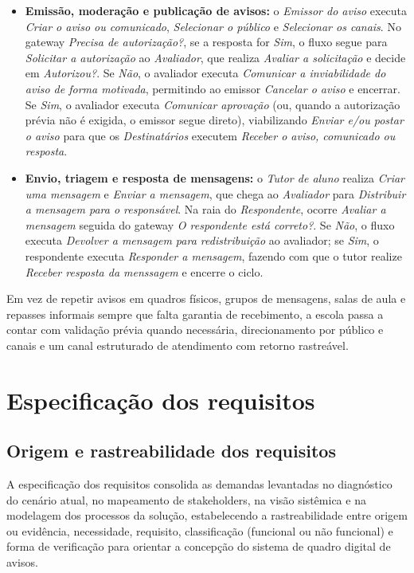 \documentclass[a4paper,12pt]{report}
\begin{document}
\begin{itemize}
    \item \textbf{Emissão, moderação e publicação de avisos:} o \textit{Emissor do aviso} executa \textit{Criar o aviso ou comunicado}, \textit{Selecionar o público} e \textit{Selecionar os canais}. No gateway \textit{Precisa de autorização?}, se a resposta for \textit{Sim}, o fluxo segue para \textit{Solicitar a autorização} ao \textit{Avaliador}, que realiza \textit{Avaliar a solicitação} e decide em \textit{Autorizou?}. Se \textit{Não}, o avaliador executa \textit{Comunicar a inviabilidade do aviso de forma motivada}, permitindo ao emissor \textit{Cancelar o aviso} e encerrar. Se \textit{Sim}, o avaliador executa \textit{Comunicar aprovação} (ou, quando a autorização prévia não é exigida, o emissor segue direto), viabilizando \textit{Enviar e/ou postar o aviso} para que os \textit{Destinatários} executem \textit{Receber o aviso, comunicado ou resposta}.
    \item \textbf{Envio, triagem e resposta de mensagens:} o \textit{Tutor de aluno} realiza \textit{Criar uma mensagem} e \textit{Enviar a mensagem}, que chega ao \textit{Avaliador} para \textit{Distribuir a mensagem para o responsável}. Na raia do \textit{Respondente}, ocorre \textit{Avaliar a mensagem} seguida do gateway \textit{O respondente está correto?}. Se \textit{Não}, o fluxo executa \textit{Devolver a mensagem para redistribuição} ao avaliador; se \textit{Sim}, o respondente executa \textit{Responder a mensagem}, fazendo com que o tutor realize \textit{Receber resposta da menssagem} e encerre o ciclo.
\end{itemize}

Em vez de repetir avisos em quadros físicos, grupos de mensagens, salas de aula e repasses informais sempre que falta garantia de recebimento, a escola passa a contar com validação prévia quando necessária, direcionamento por público e canais e um canal estruturado de atendimento com retorno rastreável.

\chapter{Especificação dos requisitos}

\section{Origem e rastreabilidade dos requisitos}

A especificação dos requisitos consolida as demandas levantadas no diagnóstico do cenário atual, no mapeamento de stakeholders, na visão sistêmica e na modelagem dos processos da solução, estabelecendo a rastreabilidade entre origem ou evidência, necessidade, requisito, classificação (funcional ou não funcional) e forma de verificação para orientar a concepção do sistema de quadro digital de avisos.
\end{document}
